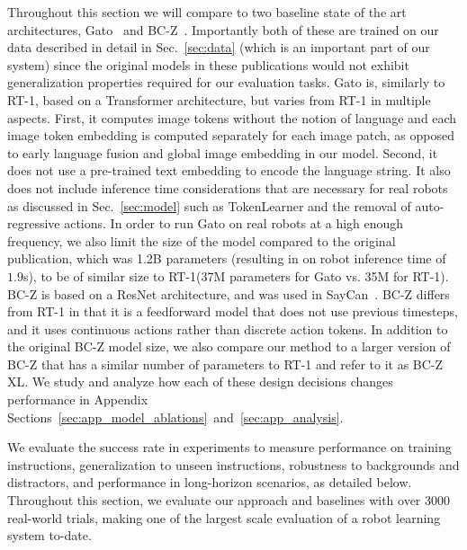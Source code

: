 \documentclass{article} %
\newcommand{\algname}{RT-1\xspace}
\begin{document}
Throughout this section we will compare to two baseline state of the art architectures, Gato~\citep{reed2022generalist} and BC-Z~\citep{jang2022bc}. 
Importantly both of these are trained on our data described in detail in Sec.~\ref{sec:data} (which is an important part of our system) since the original models in these publications would not exhibit generalization properties required for our evaluation tasks.
Gato is, similarly to \algname, based on a Transformer architecture, but varies from \algname in multiple aspects. First, it computes image tokens without the notion of language and each image token embedding is computed separately for each image patch, as opposed to early language fusion and global image embedding in our model. Second, it does not use a pre-trained text embedding to encode the language string. It also does not include inference time considerations that are necessary for real robots as discussed in Sec.~\ref{sec:model} such as TokenLearner and the removal of auto-regressive actions. In order to run Gato on real robots at a high enough frequency, we also limit the size of the model compared to the original publication, which was 1.2B parameters (resulting in on robot inference time of $1.9$s), to be of similar size to \algname (37M parameters for Gato vs. 35M for \algname).
BC-Z is based on a ResNet architecture, and was used in SayCan~\citep{ahn2022can}. BC-Z differs from \algname in that it is a feedforward model that does not use previous timesteps, and it uses continuous actions rather than
discrete action tokens. In addition to the original BC-Z model size, we also compare our method to a larger version of BC-Z that has a similar number of parameters to \algname and refer to it as BC-Z XL.
We study and analyze how each of these design decisions changes performance in Appendix Sections~\ref{sec:app_model_ablations}~and~\ref{sec:app_analysis}.

We evaluate the success rate in experiments to measure performance on training instructions, generalization to unseen instructions, robustness to backgrounds and distractors, and performance in long-horizon scenarios, as detailed below.
Throughout this section, we evaluate our approach and baselines with over 3000 real-world trials, making one of the largest scale
evaluation of a robot learning system to-date.
\end{document}

